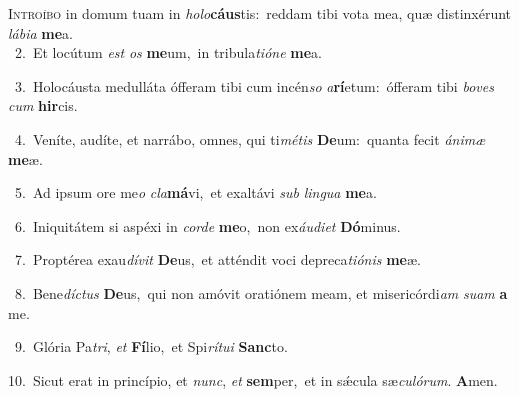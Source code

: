 \lettrine{\initial\textcolor{\initialcolor}{I}}{ntroíbo} in domum tuam in \textit{ho}\-\textit{lo}\textbf{cáus}tis:~\star reddam tibi vota mea, quæ distinxérunt \textit{lá}\-\textit{bi}\textit{a} \textbf{me}\-a.\\
{\numbfont\textcolor{\numbcolor}{~2.}}~Et locútum \textit{est} \textit{os} \textbf{me}\-um,~\star in tribula\-\textit{ti}\-\textit{ó}\textit{ne} \textbf{me}\-a.\par
{\numbfont\textcolor{\numbcolor}{~3.}}~Holocáusta medulláta ófferam tibi cum incén\textit{so} \textit{a}\-\textbf{rí}etum:~\star ófferam tibi \textit{bo}\-\textit{ves} \textit{cum} \textbf{hir}\-cis.\par
{\numbfont\textcolor{\numbcolor}{~4.}}~Veníte, audíte, et narrábo, omnes, qui ti\-\textit{mé}\-\textit{tis} \textbf{De}\-um:~\star quanta fecit \textit{á}\-\textit{ni}\textit{mæ} \textbf{me}\-æ.\par
{\numbfont\textcolor{\numbcolor}{~5.}}~Ad ipsum ore me\textit{o} \textit{cla}\-\textbf{má}vi,~\star et exaltávi \textit{sub} \textit{lin}\-\textit{gua} \textbf{me}\-a.\par
{\numbfont\textcolor{\numbcolor}{~6.}}~Iniquitátem si aspéxi in \textit{cor}\-\textit{de} \textbf{me}\-o,~\star non ex\-\textit{áu}\-\textit{di}\textit{et} \textbf{Dó}\-minus.\par
{\numbfont\textcolor{\numbcolor}{~7.}}~Proptérea exau\-\textit{dí}\-\textit{vit} \textbf{De}\-us,~\star et atténdit voci depreca\-\textit{ti}\-\textit{ó}\textit{nis} \textbf{me}\-æ.\par
{\numbfont\textcolor{\numbcolor}{~8.}}~Bene\-\textit{díc}\-\textit{tus} \textbf{De}\-us,~\star qui non amóvit oratiónem meam, et misericórdi\textit{am} \textit{su}\-\textit{am} \textbf{a} me.\par
{\numbfont\textcolor{\numbcolor}{~9.}}~Glória Pa\-\textit{tri}\-, \textit{et} \textbf{Fí}\-lio,~\star et Spi\-\textit{rí}\-\textit{tu}\textit{i} \textbf{Sanc}\-to.\par
{\numbfont\textcolor{\numbcolor}{10.}}~Sicut erat in princípio, et \textit{nunc}\-, \textit{et} \textbf{sem}\-per,~\star et in sǽcula sæ\-\textit{cu}\-\textit{ló}\textit{rum}. \textbf{A}\-men.\par
